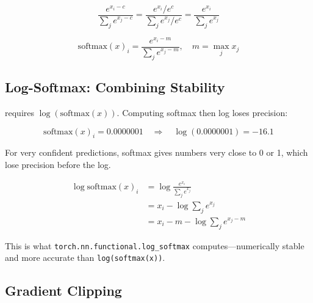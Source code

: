 \begin{equation}
    \frac{e^{x_i - c}}{\sum_j e^{x_j - c}} = \frac{e^{x_i} / e^c}{\sum_j e^{x_j} / e^c} = \frac{e^{x_i}}{\sum_j e^{x_j}}
\end{equation}

\begin{equation}
    \text{softmax}(x)_i = \frac{e^{x_i - m}}{\sum_j e^{x_j - m}}, \quad m = \max_j x_j
\end{equation}



\subsection{Log-Softmax: Combining Stability}

 requires $\log(\text{softmax}(x))$. Computing softmax then log loses precision:

\begin{equation}
    \text{softmax}(x)_i = 0.0000001 \quad \Rightarrow \quad \log(0.0000001) = -16.1
\end{equation}

For very confident predictions, softmax gives numbers very close to 0 or 1, which lose precision before the log.

\begin{align}
    \log\text{softmax}(x)_i &= \log\frac{e^{x_i}}{\sum_j e^{x_j}} \\
    &= x_i - \log\sum_j e^{x_j} \\
    &= x_i - m - \log\sum_j e^{x_j - m}
\end{align}

This is what \texttt{torch.nn.functional.log\_softmax} computes---numerically stable and more accurate than \texttt{log(softmax(x))}.




\subsection{Gradient Clipping}

